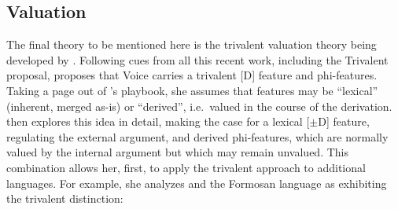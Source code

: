 \begin{exe}
\begin{xlist}
\begin{xlist}
\begin{xlist}
\begin{xlist}
\begin{xlist}
\begin{xlist}
\begin{exe}
\begin{xlist}
\begin{exe}
\begin{exe}
\begin{xlist}
\begin{exe}
\begin{exe}
\begin{xlist}
\begin{exe}
\begin{xlist}
\begin{exe}
\begin{xlist}
\begin{exe}
\begin{xlist}
\begin{exe}
\begin{xlist}
\begin{exe}
\begin{xlist}
\begin{exe}
\begin{xlist}
\begin{exe}
\begin{xlist}
	\subsection{Valuation} \label{i:agree:nie}
The final theory to be mentioned here is the trivalent valuation theory being developed by \cite{nie17}. Following cues from all this recent work, including the Trivalent proposal, \citeauthor{nie17} proposes that Voice carries a trivalent [D] feature and phi-features. Taking a page out of \citeauthor{wurmbrandshimamura17}'s playbook, she assumes that features may be ``lexical'' (inherent, merged as-is) or ``derived'', i.e.~valued in the course of the derivation. \citeauthor{nie17} then explores this idea in detail, making the case for a lexical [$\pm$D] feature, regulating the external argument, and derived phi-features, which are normally valued by the internal argument but which may remain unvalued. This combination allows her, first, to apply the trivalent approach to additional languages. For example, she analyzes  and the Formosan language  as exhibiting the trivalent distinction:
 \begin{exe}
 \ex \label{ex:puyuma} 
 \begin{xlist} 
	
	
 \z
\z 


\end{xlist}
\end{exe}
\end{xlist}
\end{exe}
\end{xlist}
\end{exe}
\end{xlist}
\end{exe}
\end{xlist}
\end{exe}
\end{xlist}
\end{exe}
\end{xlist}
\end{exe}
\end{xlist}
\end{exe}
\end{xlist}
\end{exe}
\end{exe}
\end{xlist}
\end{exe}
\end{exe}
\end{xlist}
\end{exe}
\end{xlist}
\end{xlist}
\end{xlist}
\end{xlist}
\end{xlist}
\end{xlist}
\end{exe}
